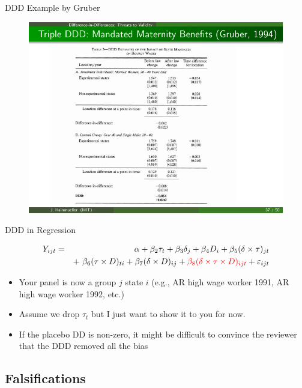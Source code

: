 \documentclass{beamer}
\begin{document}
\begin{frame}{DDD Example by Gruber}
	
	\begin{figure}
	\includegraphics{./lecture_includes/gruber_ddd_3.pdf}
	\end{figure}
	
\end{frame}

\begin{frame}{DDD in Regression}
	
	\begin{eqnarray*}
	Y_{ijt} &=&\alpha +  \beta_2 \tau_t + \beta_3 \delta_j  + \beta_4 D_i + \beta_5(\delta \times \tau)_{jt} \\
	&& +\ \beta_6(\tau \times D)_{ti} +  \beta_7(\delta \times D)_{ij} +  \textcolor{red}{\beta_8(\delta \times \tau \times  D)_{ijt}}+  \varepsilon_{ijt}
	\end{eqnarray*}
	
	\begin{itemize}
	\item Your panel is now a group $j$ state $i$ (e.g., AR high wage worker 1991, AR high wage worker 1992, etc.)
	\item Assume we drop $\tau_t$ but I just want to show it to you for now.
	\item If the placebo DD is non-zero, it might be difficult to convince the reviewer that the DDD removed all the bias 
	\end{itemize}
	
\end{frame}


\subsection{Falsifications}
\end{document}

